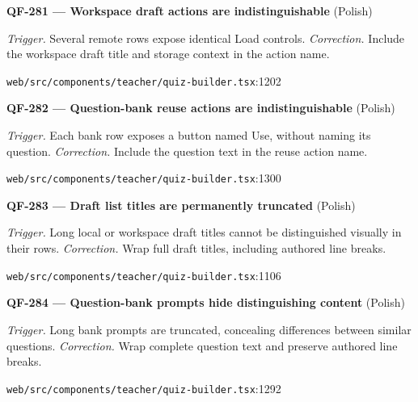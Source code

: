\begin{minipage}{\linewidth}
\textbf{QF-281 --- Workspace draft actions are indistinguishable} {\scriptsize\color{accent}(Polish)}\par
\textit{Trigger.} Several remote rows expose identical Load controls. \textit{Correction.} Include the workspace draft title and storage context in the action name.\par
{\scriptsize\color{muted}\nolinkurl{web/src/components/teacher/quiz-builder.tsx}:1202}\par
\end{minipage}\par\vspace{7pt}
\begin{minipage}{\linewidth}
\textbf{QF-282 --- Question-bank reuse actions are indistinguishable} {\scriptsize\color{accent}(Polish)}\par
\textit{Trigger.} Each bank row exposes a button named Use, without naming its question. \textit{Correction.} Include the question text in the reuse action name.\par
{\scriptsize\color{muted}\nolinkurl{web/src/components/teacher/quiz-builder.tsx}:1300}\par
\end{minipage}\par\vspace{7pt}
\begin{minipage}{\linewidth}
\textbf{QF-283 --- Draft list titles are permanently truncated} {\scriptsize\color{accent}(Polish)}\par
\textit{Trigger.} Long local or workspace draft titles cannot be distinguished visually in their rows. \textit{Correction.} Wrap full draft titles, including authored line breaks.\par
{\scriptsize\color{muted}\nolinkurl{web/src/components/teacher/quiz-builder.tsx}:1106}\par
\end{minipage}\par\vspace{7pt}
\begin{minipage}{\linewidth}
\textbf{QF-284 --- Question-bank prompts hide distinguishing content} {\scriptsize\color{accent}(Polish)}\par
\textit{Trigger.} Long bank prompts are truncated, concealing differences between similar questions. \textit{Correction.} Wrap complete question text and preserve authored line breaks.\par
{\scriptsize\color{muted}\nolinkurl{web/src/components/teacher/quiz-builder.tsx}:1292}\par
\end{minipage}\par\vspace{7pt}
